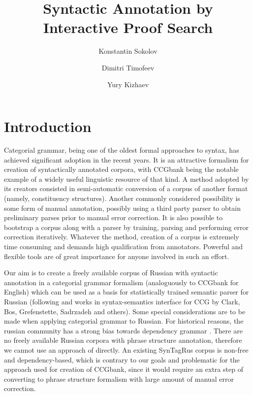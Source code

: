 \documentclass[a4paper]{article}
\theoremstyle{example-style}
\begin{document}
\title{Syntactic Annotation by Interactive Proof Search}
\author[1]{Konstantin Sokolov}
\author[2]{Dimitri Timofeev}
\author[3]{Yury Kizhaev}
\date{}

\maketitle

\section{Introduction}

Categorial grammar, being one of the oldest formal approaches to syntax, has achieved significant adoption in the recent years. It is an attractive formalism for creation of syntactically annotated corpora, with CCGbank \parencite{hockenmaier2007ccgbank} being the notable example of a widely useful linguistic resource of that kind. A method adopted by its creators consisted in semi-automatic conversion of a corpus of another format (namely, constituency structures). Another commonly considered possibility is some form of manual annotation, possibly using a third party parser to obtain preliminary parses prior to manual error correction. It is also possible to bootstrap a corpus along with a parser by training, parsing and performing error correction iteratively. Whatever the method, creation of a corpus is extremely time consuming and demands high qualification from annotators. Powerful and flexible tools are of great importance for anyone involved in such an effort.

Our aim is to create a freely available corpus of Russian with syntactic annotation in a categorial grammar formalism (analoguously to CCGbank for English) which can be used as a basis for statistically trained semantic parser for Russian (following \parencite{clark2007wide} and works in syntax-semantics interface for CCG  by Clark, Bos, Grefenstette, Sadrzadeh and others). Some special considerations are to be made when applying categorial grammar to Russian. For historical reasons, the russian community has a strong bias towards dependency grammar \parencite{toldova2012nlp}. There are no freely available Russian corpora with phrase structure annotation, therefore we cannot use an approach of \parencite{hockenmaier2007ccgbank} directly. An existing SynTagRus corpus \parencite{boguslavsky2002development} is non-free and dependency-based, which is contrary to our goals and problematic for the  approach used for creation of CCGbank, since it would require an extra step of converting to phrase structure formalism with large amount of manual error correction.
 
\end{document}
